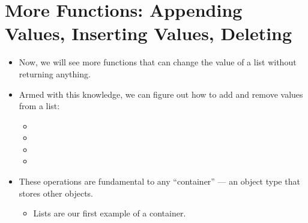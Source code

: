 \documentclass[letterpaper,10pt,english]{sphinxmanual}
\begin{document}
\section{More Functions: Appending Values, Inserting Values, Deleting}
\label{\detokenize{lecture_notes/lec08_lists1:more-functions-appending-values-inserting-values-deleting}}\begin{itemize}
\item {} 
Now, we will see more functions that can change the value of a list
without returning anything.

\item {} 
Armed with this knowledge, we can figure out how to add and remove
values from a list:
\begin{itemize}
\item {} 

\item {} 

\item {} 

\item {} 

\end{itemize}

\item {} 
These operations are fundamental to any “container” — an object type
that stores other objects.
\begin{itemize}
\item {} 
Lists are our first example of a container.

\end{itemize}

\end{itemize}
\end{document}
